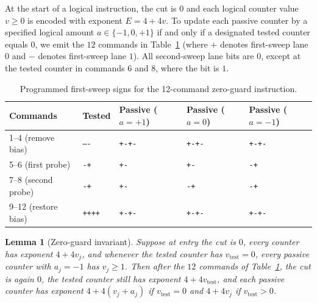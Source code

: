 \documentclass{article}
\newtheorem{lemma}[theorem]{Lemma}
\theoremstyle{definition}
\theoremstyle{remark}
\newcommand{\ttw}[1]{\texttt{#1}}
\begin{document}
At the start of a logical instruction, the cut is $0$ and each logical counter value $v \ge 0$ is encoded with exponent $E = 4 + 4v$.
To update each passive counter by a specified logical amount $a \in \{-1, 0, +1\}$ if and only if a designated tested counter equals $0$, we emit the $12$ commands in Table~\ref{tab:guard} (where $+$ denotes first-sweep lane $0$ and $-$ denotes first-sweep lane $1$).
All second-sweep lane bits are $0$, except at the tested counter in commands $6$ and $8$, where the bit is $1$.

\begin{table}[h]
\centering
\begin{tabular}{@{}lllll@{}}
\toprule
Commands & Tested & Passive ($a=+1$) & Passive ($a=0$) & Passive ($a=-1$) \\
\midrule
1--4 (remove bias)  & \ttw{----} & \ttw{+-+-} & \ttw{+-+-} & \ttw{+-+-} \\
5--6 (first probe)  & \ttw{-+}   & \ttw{+-}   & \ttw{+-}   & \ttw{-+}   \\
7--8 (second probe) & \ttw{-+}   & \ttw{+-}   & \ttw{-+}   & \ttw{-+}   \\
9--12 (restore bias)& \ttw{++++} & \ttw{+-+-} & \ttw{+-+-} & \ttw{+-+-} \\
\bottomrule
\end{tabular}
\caption{Programmed first-sweep signs for the 12-command zero-guard instruction.}
\label{tab:guard}
\end{table}

\begin{lemma}[Zero-guard invariant]\label{lem:guard}
Suppose at entry the cut is $0$, every counter has exponent $4 + 4v_j$, and whenever the tested counter has $v_{\mathrm{test}} = 0$, every passive counter with $a_j = -1$ has $v_j \ge 1$.
Then after the $12$ commands of Table~\ref{tab:guard}, the cut is again $0$, the tested counter still has exponent $4 + 4v_{\mathrm{test}}$, and each passive counter has exponent $4 + 4(v_j + a_j)$ if $v_{\mathrm{test}} = 0$ and $4 + 4v_j$ if $v_{\mathrm{test}} > 0$.
\end{lemma}
\end{document}
